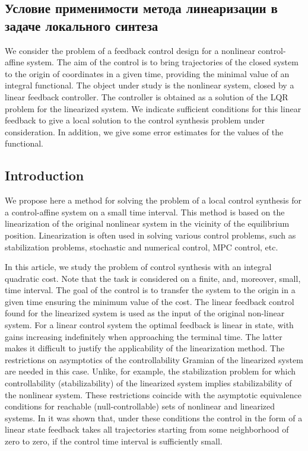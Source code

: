 \documentclass[../main.tex]{subfiles}
\begin{document}
\subsection{Условие применимости метода линеаризации в задаче локального синтеза} 
We consider the problem of a feedback control design for a nonlinear control-affine system. The aim of the control is to bring  trajectories of the closed system to the origin of coordinates in a given time, providing the minimal value of an integral functional. The object under study is the nonlinear system, closed by a linear feedback controller. The controller is  obtained as a solution of the LQR problem for the linearized system. We indicate sufficient conditions  for this linear feedback to give a local solution to the control synthesis problem under consideration.  In addition, we give some  error estimates for the values of the functional. 

\subsection{Introduction}

We propose here a method for solving the problem of a local control synthesis  for a control-affine system on a small time interval. This method is based  on the linearization of the original nonlinear system in the vicinity  of the equilibrium position.  Linearization is often used in solving various control problems, such as stabilization problems\cite{Kras_add,Khalil}, stochastic and numerical control\cite{Roxin,EKF,denBerg,Pang}, MPC control\cite{Murillo,LTV_MPC}, etc.

In this article, we study the problem of control synthesis with an integral quadratic cost. Note that the task is considered on a finite, and, moreover, small, time interval. The goal of the control is to transfer the system to the origin in a given time ensuring the minimum value of the cost. The linear feedback control found for the linearized system is used as  the input of the original non-linear system. For a linear control system the optimal feedback is linear in state, with gains increasing indefinitely when approaching the terminal time. The latter  makes it difficult to justify the applicability of the linearization method. The restrictions on  asymptotics  of the controllability Gramian of the linearized system are needed in this case. Unlike, for example, the stabilization problem for which controllability (stabilizability) of the linearized system implies stabilizability of the nonlinear system. These restrictions coincide with the  asymptotic equivalence conditions for reachable  (null-controllable) sets of nonlinear and linearized systems. In \cite{GusevOsipov} it was shown that, under these conditions the control in the form of a linear state feedback takes all trajectories starting from some neighborhood of zero to zero, if the control time interval is sufficiently small. 
\end{document}
